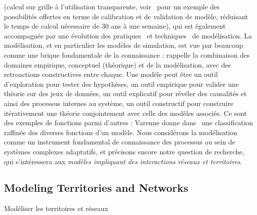 { (calcul sur grille à l'utilisation transparente, voir~\cite{schmitt2014half} pour un exemple des possibilités offertes en terme de calibration et de validation de modèle, réduisant le temps de calcul nécessaire de 30 ans à une semaine), qui est également accompagnée par une évolution des pratiques~\cite{banos2013pour} et techniques~\cite{10.1371/journal.pone.0138212} de modélisation. La modélisation, et en particulier les modèles de simulation, est vue par beaucoup comme une brique fondamentale de la connaissance : \cite{livet2010} rappelle la combinaison des domaines empirique, conceptuel (théorique) et de la modélisation, avec des retroactions constructives entre chaque. Une modèle peut être un outil d'exploration pour tester des hypothèses, un outil empirique pour valider une théorie sur des jeux de données, un outil explicatif pour révéler des causalités et ainsi des processus internes au système, un outil constructif pour construire itérativement une théorie conjointement avec celle des modèles associés. Ce sont des exemples de fonctions parmi d'autres : Varenne donne dans~\cite{varenne2010simulations} une classification raffinée des diverses fonctions d'un modèle. Nous considérons la modélisation comme un instrument fondamental de connaissance des processus au sein de systèmes complexes adaptatifs, et précisons encore notre question de recherche, qui s'intéressera aux \emph{modèles impliquant des interactions réseaux et territoires}.
}


\subsection{Modeling Territories and Networks}{Modéliser les territoires et réseaux}



